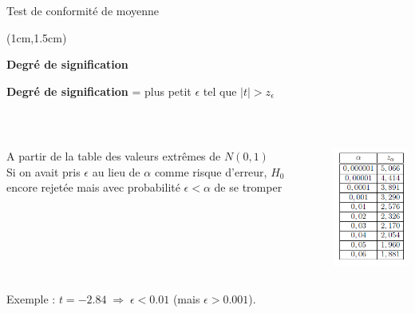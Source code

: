 \documentclass{beamer}
\begin{document}
\begin{frame}{Test de conformité de moyenne}
\begin{textblock*}{\textwidth}(1cm,1.5cm)

\begin{center}{\bf \Large Degré de signification  } \end{center}

\vspace{0.5cm}

{\bf Degré de signification} = plus petit $\epsilon$ tel que $|t|>z_\epsilon$ 

 \
\begin{columns}[c]
  \begin{column}{6cm}
A partir de la table des valeurs extrêmes de $N(0,1)$  \\
Si on avait pris $\epsilon$ au lieu de $\alpha$ comme risque d'erreur, $H_0$ encore rejetée mais avec probabilité $\epsilon<\alpha$ de se tromper
  \end{column}
  \begin{column}{4cm}
\includegraphics[scale=0.6]{images/g_degredesignification.png}
  \end{column}
 \end{columns}  

Exemple : $ t=-2.84 \; \Rightarrow \; \epsilon<0.01 $ (mais $\epsilon > 0.001$).

\end{textblock*}

\end{frame}

\end{document}

